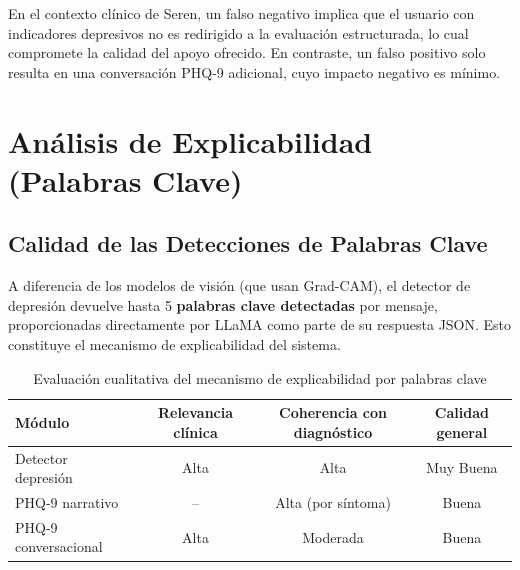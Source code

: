 En el contexto clínico de Seren, un falso negativo implica que el usuario con indicadores
depresivos no es redirigido a la evaluación estructurada, lo cual compromete la calidad del
apoyo ofrecido. En contraste, un falso positivo solo resulta en una conversación PHQ-9
adicional, cuyo impacto negativo es mínimo.

\section{Análisis de Explicabilidad (Palabras Clave)}

\subsection{Calidad de las Detecciones de Palabras Clave}

A diferencia de los modelos de visión (que usan Grad-CAM), el detector de depresión
devuelve hasta 5 \textbf{palabras clave detectadas} por mensaje, proporcionadas
directamente por LLaMA como parte de su respuesta JSON. Esto constituye el mecanismo
de explicabilidad del sistema.

\begin{table}[H]
\centering
\caption{Evaluación cualitativa del mecanismo de explicabilidad por palabras clave}
\label{tab:keywords_quality}
\begin{tabular}{lccc}
\toprule
\textbf{Módulo}         & \textbf{Relevancia clínica} & \textbf{Coherencia con diagnóstico} & \textbf{Calidad general} \\
\midrule
Detector depresión      & Alta                        & Alta                                & Muy Buena    \\
PHQ-9 narrativo         & --                          & Alta (por síntoma)                  & Buena        \\
PHQ-9 conversacional    & Alta                        & Moderada                            & Buena        \\
\bottomrule
\end{tabular}
\end{table}

